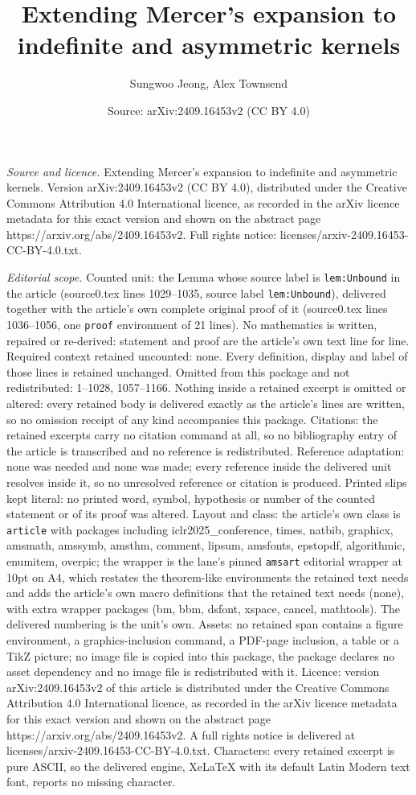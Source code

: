 \documentclass[10pt,a4paper]{amsart}
\title[Extending Mercer's expansion to indefinite and asymmetric ke]{Extending Mercer's expansion to indefinite and asymmetric kernels}
\author{Sungwoo Jeong, Alex Townsend}
\date{Source: arXiv:2409.16453v2 (CC BY 4.0)}
\begin{document}
\maketitle

\noindent\emph{Source and licence.} Extending Mercer's expansion to indefinite and asymmetric kernels. Version arXiv:2409.16453v2 (CC BY 4.0), distributed under the Creative Commons Attribution 4.0 International licence, as recorded in the arXiv licence metadata for this exact version and shown on the abstract page https://arxiv.org/abs/2409.16453v2. Full rights notice: licenses/arxiv-2409.16453-CC-BY-4.0.txt.\par\smallskip

\noindent\textit{Editorial scope.} Counted unit: the Lemma whose source label is \texttt{lem:Unbound} in the article (source0.tex lines 1029--1035, source label \texttt{lem:Unbound}), delivered together with the article's own complete original proof of it (source0.tex lines 1036--1056, one \texttt{proof} environment of 21 lines). No mathematics is written, repaired or re-derived: statement and proof are the article's own text line for line. Required context retained uncounted: none. Every definition, display and label of those lines is retained unchanged. Omitted from this package and not redistributed: 1--1028, 1057--1166. Nothing inside a retained excerpt is omitted or altered: every retained body is delivered exactly as the article's lines are written, so no omission receipt of any kind accompanies this package. Citations: the retained excerpts carry no citation command at all, so no bibliography entry of the article is transcribed and no reference is redistributed. Reference adaptation: none was needed and none was made; every reference inside the delivered unit resolves inside it, so no unresolved reference or citation is produced. Printed slips kept literal: no printed word, symbol, hypothesis or number of the counted statement or of its proof was altered. Layout and class: the article's own class is \texttt{article} with packages including iclr2025\_conference, times, natbib, graphicx, amsmath, amssymb, amsthm, comment, lipsum, amsfonts, epstopdf, algorithmic, enumitem, overpic; the wrapper is the lane's pinned \texttt{amsart} editorial wrapper at 10pt on A4, which restates the theorem-like environments the retained text needs and adds the article's own macro definitions that the retained text needs (none), with extra wrapper packages (bm, bbm, dsfont, xspace, cancel, mathtools). The delivered numbering is the unit's own. Assets: no retained span contains a figure environment, a graphics-inclusion command, a PDF-page inclusion, a table or a TikZ picture; no image file is copied into this package, the package declares no asset dependency and no image file is redistributed with it. Licence: version arXiv:2409.16453v2 of this article is distributed under the Creative Commons Attribution 4.0 International licence, as recorded in the arXiv licence metadata for this exact version and shown on the abstract page https://arxiv.org/abs/2409.16453v2. A full rights notice is delivered at licenses/arxiv-2409.16453-CC-BY-4.0.txt. Characters: every retained excerpt is pure ASCII, so the delivered engine, XeLaTeX with its default Latin Modern text font, reports no missing character.
\end{document}
